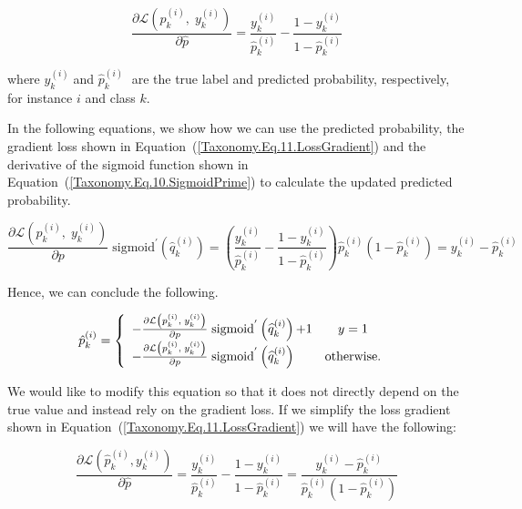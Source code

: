 \begin{equation}
    \label{Taxonomy.Eq.11.LossGradient}
    \frac{\partial \mathcal{L} \left( \widehat{p}_k^{(i)},\;y_k^{(i)}\right)}{\partial \widehat{p}}=\frac{y_k^{(i)}}{\widehat{p}_k^{(i)}}-\frac{1-y_k^{(i)}}{1-\widehat{p}_k^{(i)}}
\end{equation}


where $y_k^{(i)}\; $and ${\widehat p}_k^{(i)}\; $ are the true label and predicted probability, respectively, for instance $i $ and class $k $.

In the following equations, we show how we can use the predicted probability, the gradient loss shown in Equation~(\ref{Taxonomy.Eq.11.LossGradient}) and the derivative of the sigmoid function shown in Equation~(\ref{Taxonomy.Eq.10.SigmoidPrime}) to calculate the updated predicted probability.


\begin{equation}
\label{Taxonomy.Eq.12.NewPredElement}
\frac{\partial \mathcal{L}\left(p_k^{(i)},\; y_k^{(i)}\right)}{\partial p}\;\text{sigmoid}^{'}\left(\widehat{q}_k^{(i)}\right)=\left(\frac{y_k^{(i)}}{\widehat{p}_k^{(i)}}-\frac{1-y_k^{(i)}}{1-\widehat{p}_k^{(i)}}\right)\widehat{p}_k^{(i)}\left(1-\widehat{p}_k^{(i)}\right)=y_k^{(i)}-\widehat{p}_k^{(i)}
\end{equation}

Hence, we can conclude the following.

\begin{equation}
    \label{Taxonomy.Eq.13.NewPred}
    \begin{array}{@{}l}\hat{p}_{k}^{(i)} = \left\{\begin{array}{lc}-\frac{\partial \mathcal{L}\left(p_k^{(i)},\;y_k^{(i)}\right)}{\partial p}\;\text{sigmoid}^{'}\left(\widehat{q}_k^{(i)}\right)\text{+1}&y=1\\-\frac{\partial \mathcal{L}\left(p_k^{(i)},\;y_k^{(i)}\right)}{\partial p}\;\text{sigmoid}^{'}\left(\widehat{q}_k^{(i)}\right) & \text{otherwise.} \end{array}\right.\end{array}
\end{equation}

We would like to modify this equation so that it does not directly depend on the true value and instead rely on the gradient loss. If we simplify the loss gradient shown in Equation~(\ref{Taxonomy.Eq.11.LossGradient})  we will have the following:

\begin{equation}
    \label{Taxonomy.Eq.14.NewLossGradient}
    \frac{\partial \mathcal{L}(\widehat{p}_k^{(i)}, y_k^{(i)})}{\partial \widehat{p}} = \frac{y_k^{(i)}}{\widehat{p}_k^{(i)}} - \frac{1 - y_k^{(i)}}{1 - \widehat{p}_k^{(i)}} = \frac{y_k^{(i)} - \widehat{p}_k^{(i)}}{\widehat{p}_k^{(i)}(1 - \widehat{p}_k^{(i)})}
\end{equation}


